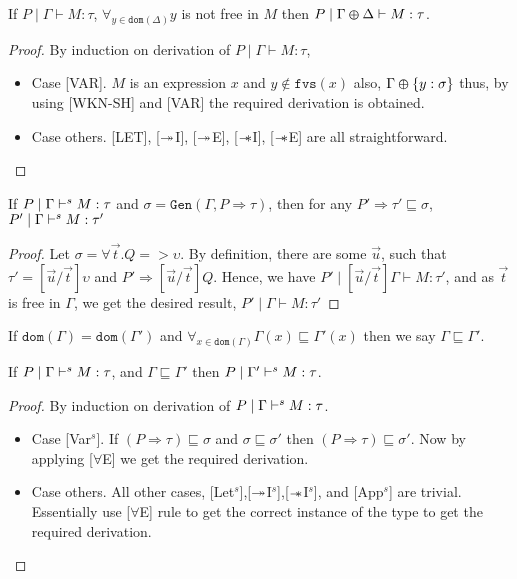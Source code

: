 \begin{lemma}\label{lemma:WKN-SH-helper}
  If $P \mid \Gamma \vdash M:\tau$, $\forall_{y \in \texttt{dom}(\Delta)} y$ is not free in $M$ then $P \mid \Gamma \varoplus \Delta \vdash M:\tau$.
\end{lemma}
\begin{proof}
  By induction on derivation of $P \mid \Gamma \vdash M:\tau$,
  \begin{itemize}
  \item{Case [VAR].} $M$ is an expression $x$ and $y \notin \texttt{fvs}(x)$ also, $\Gamma \varoplus \{y:\sigma\}$ thus, by using
    [WKN-SH] and [VAR] the required derivation is obtained.
  \item{Case others.}  [LET], [$\twoheadrightarrow$I], [$\twoheadrightarrow$E], [$\mathrel{-\mkern-6mu*}$I], [$\mathrel{-\mkern-6mu*}$E] are all straightforward.\qedhere
  \end{itemize}
\end{proof}

\begin{lemma}\label{lemma:impl-helper}
  If $P \mid \Gamma \vdash^s M:\tau$ and $\sigma = \texttt{Gen}(\Gamma, P \Rightarrow \tau)$,
  then for any $P' \Rightarrow \tau' \sqsubseteq \sigma$, $P' \mid \Gamma \vdash^s M:\tau' $
\end{lemma}
\begin{proof}
  Let $\sigma = \forall \vec{t}. Q => \upsilon$. By definition, there are some $\vec{u}$, such that
  $\tau' = [\vec{u}/\vec{t}]\upsilon$ and $P' \Rightarrow [\vec{u}/\vec{t}]Q$. Hence, we have
  $P' \mid [\vec{u}/\vec{t}]\Gamma \vdash M :\tau'$, and as $\vec{t}$ is free in $\Gamma$, we get the
  desired result, $P' \mid \Gamma \vdash M:\tau'$\qedhere
\end{proof}

\begin{defn}
  If $\texttt{dom}(\Gamma) = \texttt{dom}(\Gamma')$ and $\forall_{x \in \texttt{dom}(\Gamma)} \Gamma(x) \sqsubseteq \Gamma'(x)$
  then we say $\Gamma \sqsubseteq \Gamma'$.
\end{defn}

\begin{lemma}\label{lemma:let-helper}
  If $P \mid \Gamma \vdash^s M: \tau$, and $\Gamma \sqsubseteq \Gamma'$ then $P \mid \Gamma' \vdash^s M:\tau$.
\end{lemma}
\begin{proof}
  By induction on derivation of $P \mid \Gamma \vdash^s M: \tau$.
  \begin{itemize}
  \item{Case [Var$^s$].} If $(P \Rightarrow \tau) \sqsubseteq \sigma$ and $\sigma \sqsubseteq \sigma'$ then $(P \Rightarrow \tau) \sqsubseteq \sigma'$.
    Now by applying [$\forall$E] we get the required derivation.
  \item{Case others.} All other cases, [Let$^s$],[$\twoheadrightarrow$I$^s$],[$\mathrel{-\mkern-6mu*}$I$^s$], and [App$^s$] are trivial.
    Essentially use [$\forall$E] rule to get the correct instance of the type to get the required derivation.\qedhere
  \end{itemize}
\end{proof}

